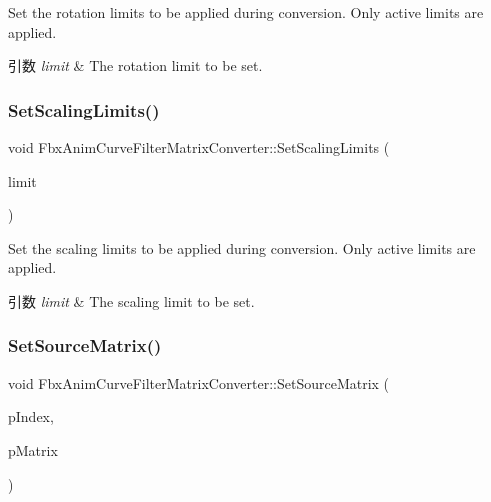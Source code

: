 Set the rotation limits to be applied during conversion. Only active limits are applied. 
\begin{DoxyParams}{引数}
{\em limit} & The rotation limit to be set. \\
\hline
\end{DoxyParams}
\mbox{\label{class_fbx_anim_curve_filter_matrix_converter_ad291cc58221b27ffa8824c73d00cc0ba}} 
\subsubsection{\texorpdfstring{Set\+Scaling\+Limits()}{SetScalingLimits()}}
{\footnotesize\ttfamily void Fbx\+Anim\+Curve\+Filter\+Matrix\+Converter\+::\+Set\+Scaling\+Limits (\begin{DoxyParamCaption}\item[{\hyperlink{class_fbx_limits}{Fbx\+Limits} \&}]{limit }\end{DoxyParamCaption})}

Set the scaling limits to be applied during conversion. Only active limits are applied. 
\begin{DoxyParams}{引数}
{\em limit} & The scaling limit to be set. \\
\hline
\end{DoxyParams}
\mbox{\label{class_fbx_anim_curve_filter_matrix_converter_a51f8c45cecbe23a5df38bd0f2b4feb08}} 
\subsubsection{\texorpdfstring{Set\+Source\+Matrix()}{SetSourceMatrix()}}
{\footnotesize\ttfamily void Fbx\+Anim\+Curve\+Filter\+Matrix\+Converter\+::\+Set\+Source\+Matrix (\begin{DoxyParamCaption}\item[{\hyperlink{class_fbx_anim_curve_filter_matrix_converter_a41638d5acd6d14ef0f095ab75b18ee69}{E\+Matrix\+Index}}]{p\+Index,  }\item[{\hyperlink{class_fbx_a_matrix}{Fbx\+A\+Matrix} \&}]{p\+Matrix }\end{DoxyParamCaption})}

